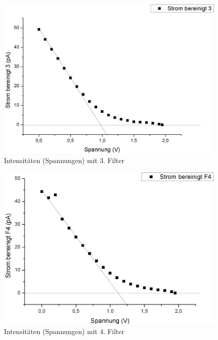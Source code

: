 \documentclass[12pt,a4paper]{article}
\begin{document}
\begin{multicols}{2}
\begin{figure}[H]
	\centering
	\includegraphics[scale=0.35]{./data/Filter3.png}
	\caption{Intensitäten (Spannungen) mit 3. Filter}
	\label{fig:filter3}
\end{figure}

\begin{figure}[H]
	\centering
	\includegraphics[scale=0.35]{./data/Filter4.png}
	\caption{Intensitäten (Spannungen) mit 4. Filter}
	\label{fig:filter4}
\end{figure}


\end{multicols}
\end{document}
